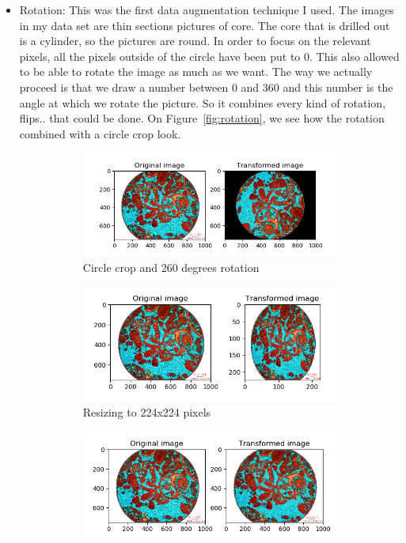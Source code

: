 \begin{itemize}
    \item Rotation: This was the first data augmentation technique I used. The images in my data set are thin sections pictures of core. The core that is drilled out is a cylinder, so the pictures are round. In order to focus on the relevant pixels, all the pixels outside of the circle have been put to 0. This also allowed to be able to rotate the image as much as we want. The way we actually proceed is that we draw a number between 0 and 360 and this number is the angle at which we rotate the picture. So it combines every kind of rotation, flips.. that could be done. On Figure~\ref{fig:rotation}, we see how the rotation combined with a circle crop look.
\begin{figure}
\begin{subfigure}{.5\textwidth}
  \centering
  \includegraphics[width=.8\linewidth]{./figures/03-rotation_260}
  \caption{Circle crop and 260 degrees rotation}
  \label{fig:rotate}
\end{subfigure}%
\begin{subfigure}{.5\textwidth}
  \centering
  \includegraphics[width=.8\linewidth]{figures/03-resize.PNG}
  \caption{Resizing to 224x224 pixels}
  \label{fig:resize}
\end{subfigure}
\begin{subfigure}{.5\textwidth}
  \centering
  \includegraphics[width=.8\linewidth]{figures/03-elastic_trans_08_03.PNG}

\end{subfigure}
\end{figure}
\end{itemize}
